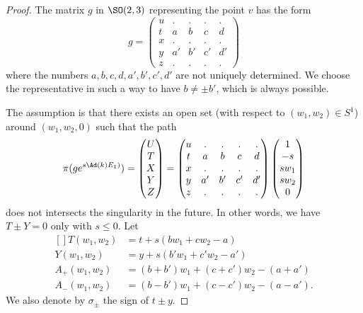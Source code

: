 \begin{proof}
The matrix $g$ in $\SO(2,3)$ representing the point $v$ has the form
\begin{equation}
	g=\begin{pmatrix}
 u	&	.	&	.	&	.	&	.\\
 t	&	a	&	b	&	c	&	d\\
 x	&	.	&	.	&	.	&	.\\
 y	&	a'	&	b'	&	c'	&	d'\\
z	&	.	&	.	&	.	&	.
 \end{pmatrix}
\end{equation}
where the numbers $a,b,c,d,a',b',c',d'$ are not uniquely determined. We choose the representative in such a way to have $b\neq \pm b'$, which is always possible.

The assumption is that there exists an open set (with respect to $(w_1,w_2)\in S^1$) around $(w_1,w_2,0)$ such that the path
\begin{equation}		\label{EqPathgexpUTXYZ}
	\pi(g e^{s\Ad\left( k \right)E_1)})=
	\begin{pmatrix}
		U	\\
		T	\\
		X	\\
		Y	\\
		Z
	\end{pmatrix}=
	\begin{pmatrix}
 u	&	.	&	.	&	.	&	.\\
 t	&	a	&	b	&	c	&	d\\
 x	&	.	&	.	&	.	&	.\\
 y	&	a'	&	b'	&	c'	&	d'\\
z	&	.	&	.	&	.	&	.
 \end{pmatrix}
 \begin{pmatrix}
	 1	\\
	 -s	\\
	 sw_1	\\
	 sw_2	\\
	 0
 \end{pmatrix}
\end{equation}
does not intersects the singularity in the future. In other words, we have $T\pm Y=0$ only with $s\leq 0$. Let
\begin{equation}
	\begin{aligned}[]
		T(w_1,w_2)&=t+s(bw_1+cw_2-a)\\
		Y(w_1,w_2)&=y+s(b'w_1+c'w_2-a')\\
		A_+(w_1,w_2)&=(b+b')w_1+(c+c')w_2-(a+a')\\
		A_-(w_1,w_2)&=(b-b')w_1+(c-c')w_2-(a-a').
	\end{aligned}
\end{equation}
We also denote by $\sigma_{\pm}$ the sign of $t\pm y$.


\end{proof}
